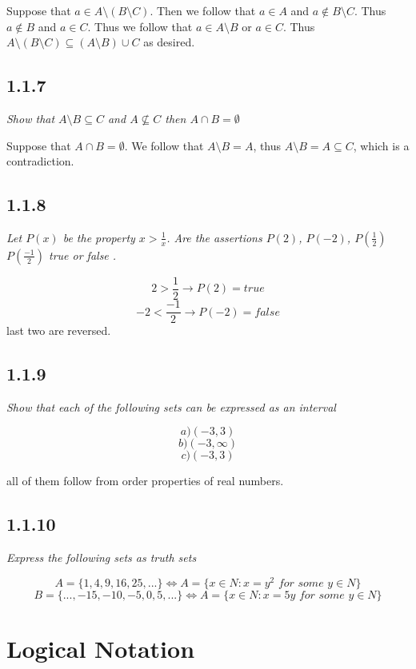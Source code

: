 \documentclass[11pt,oneside,titlepage]{book}
\begin{document}
Suppose that $a \in A \setminus (B \setminus C)$. Then we follow that
$a \in A$ and $a \notin B \setminus C$. Thus $a \notin B$ and $a \in C$. Thus we
follow that $a \in A \setminus B$ or $a \in C$. Thus
$A \setminus (B \setminus C) \subseteq (A \setminus B) \cup C$
as desired.

\subsection*{1.1.7}

\textit{Show that $A \setminus B \subseteq C$ and $A \not \subseteq C$ then
  $A \cap B = \emptyset$}

Suppose that $A \cap B = \emptyset$. We follow that $A \setminus B = A$, thus
$A \setminus B = A \subseteq C$, which is a contradiction.

\subsection*{1.1.8}

\textit{Let $P(x)$ be the property $x > \frac 1 x$. Are the assertions $P(2)$, $P(-2)$,
  $P(\frac 1 2)$ $P( \frac{-1}{2})$ true or false .}

$$2 > \frac 1 2 \to P(2) = true$$
$$-2 < \frac{-1}{2} \to P(-2) = false$$
last two are reversed.

\subsection*{1.1.9}

\textit{Show that each of the following sets can be expressed as an interval}

$$a) (-3, 3)$$
$$b) (-3, \infty)$$
$$c) (-3, 3)$$

all of them follow from order properties of real numbers.

\subsection*{1.1.10}

\textit{Express the following sets as truth sets}

$$A = \{1, 4, 9, 16, 25, ...\} \iff A = \{x \in N: x = y^2 \textit{ for some } y \in N\}$$
$$B = \{..., -15, -10, -5, 0, 5, ... \} \iff A = \{x \in N: x = 5y  \textit{ for some } y \in N\}$$

\section{Logical Notation}
\end{document}
